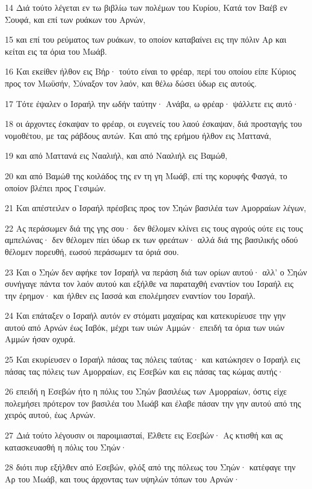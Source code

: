 \par 14 Διά τούτο λέγεται εν τω βιβλίω των πολέμων του Κυρίου, Κατά τον Βαέβ εν Σουφά, και επί των ρυάκων του Αρνών,
\par 15 και επί του ρεύματος των ρυάκων, το οποίον καταβαίνει εις την πόλιν Αρ και κείται εις τα όρια του Μωάβ.
\par 16 Και εκείθεν ήλθον εις Βήρ· τούτο είναι το φρέαρ, περί του οποίου είπε Κύριος προς τον Μωϋσήν, Σύναξον τον λαόν, και θέλω δώσει ύδωρ εις αυτούς.
\par 17 Τότε έψαλεν ο Ισραήλ την ωδήν ταύτην· Ανάβα, ω φρέαρ· ψάλλετε εις αυτό·
\par 18 οι άρχοντες έσκαψαν το φρέαρ, οι ευγενείς του λαού έσκαψαν, διά προσταγής του νομοθέτου, με τας ράβδους αυτών. Και από της ερήμου ήλθον εις Ματτανά,
\par 19 και από Ματτανά εις Νααλιήλ, και από Νααλιήλ εις Βαμώθ,
\par 20 και από Βαμώθ της κοιλάδος της εν τη γη Μωάβ, επί της κορυφής Φασγά, το οποίον βλέπει προς Γεσιμών.
\par 21 Και απέστειλεν ο Ισραήλ πρέσβεις προς τον Σηών βασιλέα των Αμορραίων λέγων,
\par 22 Ας περάσωμεν διά της γης σου· δεν θέλομεν κλίνει εις τους αγρούς ούτε εις τους αμπελώνας· δεν θέλομεν πίει ύδωρ εκ των φρεάτων· αλλά διά της βασιλικής οδού θέλομεν πορευθή, εωσού περάσωμεν τα όριά σου.
\par 23 Και ο Σηών δεν αφήκε τον Ισραήλ να περάση διά των ορίων αυτού· αλλ' ο Σηών συνήγαγε πάντα τον λαόν αυτού και εξήλθε να παραταχθή εναντίον του Ισραήλ εις την έρημον· και ήλθεν εις Ιασσά και επολέμησεν εναντίον του Ισραήλ.
\par 24 Και επάταξεν ο Ισραήλ αυτόν εν στόματι μαχαίρας και κατεκυρίευσε την γην αυτού από Αρνών έως Ιαβόκ, μέχρι των υιών Αμμών· επειδή τα όρια των υιών Αμμών ήσαν οχυρά.
\par 25 Και εκυρίευσεν ο Ισραήλ πάσας τας πόλεις ταύτας· και κατώκησεν ο Ισραήλ εις πάσας τας πόλεις των Αμορραίων, εις Εσεβών και εις πάσας τας κώμας αυτής·
\par 26 επειδή η Εσεβών ήτο η πόλις του Σηών βασιλέως των Αμορραίων, όστις είχε πολεμήσει πρότερον τον βασιλέα του Μωάβ και έλαβε πάσαν την γην αυτού από της χειρός αυτού, έως Αρνών.
\par 27 Διά τούτο λέγουσιν οι παροιμιασταί, Έλθετε εις Εσεβών· Ας κτισθή και ας κατασκευασθή η πόλις του Σηών·
\par 28 διότι πυρ εξήλθεν από Εσεβών, φλόξ από της πόλεως του Σηών· κατέφαγε την Αρ του Μωάβ, και τους άρχοντας των υψηλών τόπων του Αρνών·
